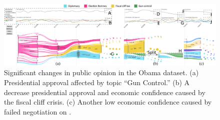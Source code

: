 \begin{figure}[t]
	\centering
	\centering
	\includegraphics[width=\linewidth]{fig/obamacase1}
	\vspace{-4mm}
	\caption{
		Significant changes in public opinion in the Obama dataset.
		(a) Presidential approval  affected by topic ``Gun Control.''
		(b) A decrease  presidential approval and economic confidence caused by the fiscal cliff crisis.
		(c) Another low economic confidence  caused by failed negotiation on .
	}
	\vspace{-5mm}
	\label{fig:obamacase1}
\end{figure}



